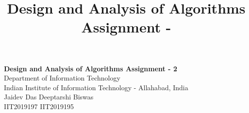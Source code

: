 \documentclass[10pt]{article}
\author{}
\title{\Large{Design and Analysis of Algorithms Assignment - }}
\begin{document}
	\begin{center}
		{\Large \textbf{Design and Analysis of Algorithms Assignment - 2}}\\
		\vspace{1em}
		{\large Department of Information Technology}\\
		\vspace{1em}
		\large{Indian Institute of Information Technology - Allahabad, India}\\
		\vspace{1em}
		\large{Jaidev Das \hspace{7em} Deeptarshi Biswas }\\
		\large{IIT2019197 \hspace{10em} IIT2019195} 
		
		\vspace{2.5em}
	\end{center}
	
\end{document}
